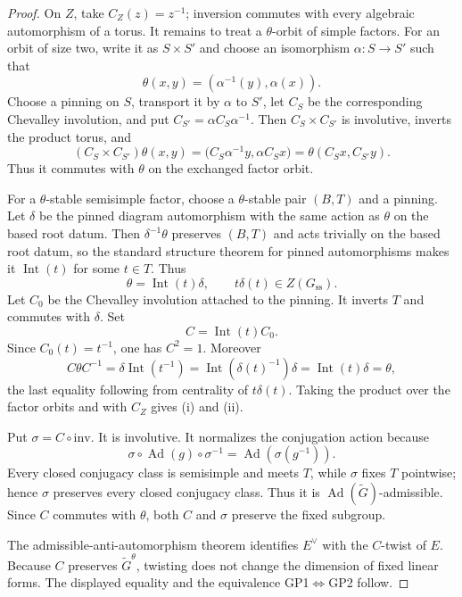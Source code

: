 \documentclass[10pt,a4paper]{amsart}
\numberwithin{equation}{section}
\newcommand{\Ad}{\operatorname{Ad}}
\begin{document}
\begin{proof}
On $Z$, take $C_Z(z)=z^{-1}$; inversion commutes with every algebraic
automorphism of a torus.  It remains to treat a $\theta$-orbit of simple factors.
For an orbit of size two, write it as $S\times S'$ and choose an isomorphism
$\alpha:S\to S'$ such that
\[
 \theta(x,y)=(\alpha^{-1}(y),\alpha(x)).
\]
Choose a pinning on $S$, transport it by $\alpha$ to $S'$, let $C_S$ be the
corresponding Chevalley involution, and put
$C_{S'}=\alpha C_S\alpha^{-1}$.  Then $C_S\times C_{S'}$ is involutive,
inverts the product torus, and
\[
 (C_S\times C_{S'})\theta(x,y)
 =\bigl(C_S\alpha^{-1}y,\alpha C_Sx\bigr)
 =\theta(C_Sx,C_{S'}y).
\]
Thus it commutes with $\theta$ on the exchanged factor orbit.

For a $\theta$-stable semisimple factor, choose a $\theta$-stable pair
$(B,T)$ and a pinning.  Let $\delta$ be the pinned diagram automorphism with
the same action as $\theta$ on the based root datum.  Then
$\delta^{-1}\theta$ preserves $(B,T)$ and acts trivially on the based root
datum, so the standard structure theorem for pinned automorphisms
\cite{Steinberg} makes it $\operatorname{Int}(t)$ for some $t\in T$.  Thus
\[
 \theta=\operatorname{Int}(t)\delta,
 \qquad t\delta(t)\in Z(G_{\mathrm{ss}}).
\]
Let $C_0$ be the Chevalley involution attached to the pinning.  It inverts $T$
and commutes with $\delta$.  Set
\[
 C=\operatorname{Int}(t)C_0.
\]
Since $C_0(t)=t^{-1}$, one has $C^2=1$.  Moreover
\[
 C\theta C^{-1}
 =\delta\operatorname{Int}(t^{-1})
 =\operatorname{Int}(\delta(t)^{-1})\delta
 =\operatorname{Int}(t)\delta=\theta,
\]
the last equality following from centrality of $t\delta(t)$.  Taking the product
over the factor orbits and with $C_Z$ gives (i) and (ii).

Put $\sigma=C\circ\mathrm{inv}$.  It is involutive.  It normalizes the
conjugation action because
\[
 \sigma\circ\Ad(g)\circ\sigma^{-1}=\Ad(\sigma(g^{-1})).
\]
Every closed conjugacy class is semisimple and meets $T$, while $\sigma$ fixes
$T$ pointwise; hence $\sigma$ preserves every closed conjugacy class.  Thus it
is $\Ad(\widetilde G)$-admissible.  Since $C$ commutes with $\theta$, both $C$
and $\sigma$ preserve the fixed subgroup.

The admissible-anti-automorphism theorem
\cite[Theorem~8.2.1 and Corollary~8.2.3]{AG09} identifies $E^\vee$ with the
$C$-twist of $E$.  Because $C$ preserves $\widetilde G^\theta$, twisting does
not change the dimension of fixed linear forms.  The displayed equality and
the equivalence GP1$\Leftrightarrow$GP2 follow.
\end{proof}
\end{document}
